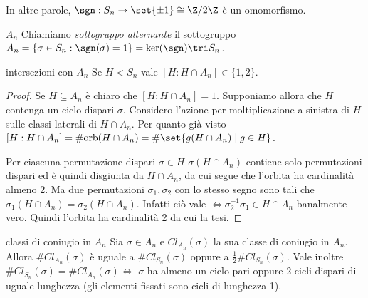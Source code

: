     In altre parole, $\sgn: S_n \rightarrow \set{\pm 1} \cong \Z/2\Z$ è un omomorfismo.
\begin{definition}{$A_n$}
    Chiamiamo \emph{sottogruppo alternante} il sottogruppo $A_n = \{\sigma \in S_n : \sgn (\sigma) = 1\} = \ker(\sgn) \tri S_n$.
\end{definition}
\begin{proposition}{intersezioni con $A_n$}
    Se $H < S_n$ vale $[H : H \cap A_n] \in \{1, 2\}$.
\end{proposition}
\begin{proof}
    Se $H \subseteq A_n$ è chiaro che $[H : H \cap A_n] = 1$. Supponiamo allora che $H$ contenga un ciclo dispari $\sigma$. 
    Considero l'azione per moltiplicazione a sinistra di $H$ sulle classi laterali di $H \cap A_n$. Per quanto già visto $[H : H \cap A_n] = \#\text{orb}(H \cap A_n) = \#\set{g(H \cap A_n)  \mid  g \in H}$.

    Per ciascuna permutazione dispari $\sigma \in H$ $\sigma(H \cap A_n)$ contiene solo permutazioni dispari ed è quindi disgiunta da $H \cap A_n$, da cui segue che l'orbita ha cardinalità almeno 2. Ma due permutazioni $\sigma_1,\sigma_2$ con lo stesso segno sono tali che $\sigma_1(H \cap A_n) = \sigma_2(H \cap A_n)$. Infatti ciò vale $\iff \sigma_2^{-1}\sigma_1 \in H \cap A_n$ banalmente vero. Quindi l'orbita ha cardinalità 2 da cui la tesi.
\end{proof}
\begin{proposition}{classi di coniugio in $A_n$}
    Sia $\sigma \in A_n$ e $Cl_{A_n}(\sigma)$ la sua classe di coniugio in $A_n$. Allora $\#Cl_{A_n}(\sigma)$ è uguale a $\#Cl_{S_n}(\sigma)$ oppure a $\frac{1}{2}\#Cl_{S_n}(\sigma)$. Vale inoltre $\#Cl_{S_n}(\sigma) = \#Cl_{A_n}(\sigma) \iff$ $\sigma$ ha almeno un ciclo pari oppure 2 cicli dispari di uguale lunghezza (gli elementi fissati sono cicli di lunghezza 1).
\end{proposition}
